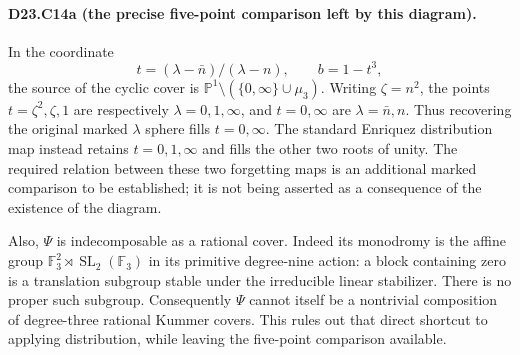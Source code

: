 \paragraph{D23.C14a (the precise five-point comparison left by this diagram).}
In the coordinate
\[
                 t=(\lambda-\bar n)/(\lambda-n),\qquad b=1-t^3,
\]
the source of the cyclic cover is
$\mathbb P^1\setminus(\{0,\infty\}\cup\mu_3)$.
Writing $\zeta=n^2$, the points
$t=\zeta^2,\zeta,1$ are respectively $\lambda=0,1,\infty$,
and $t=0,\infty$ are $\lambda=\bar n,n$.
Thus recovering the original marked $\lambda$ sphere fills
$t=0,\infty$. The standard Enriquez distribution map instead
retains $t=0,1,\infty$ and fills the other two roots of unity.
The required relation between these two forgetting maps is an
additional marked comparison to be established; it is not being
asserted as a consequence of the existence of the diagram.

Also, $\Psi$ is indecomposable as a rational cover. Indeed its
monodromy is the affine group $\mathbb F_3^2\rtimes
\operatorname{SL}_2(\mathbb F_3)$ in its primitive degree-nine
action: a block containing zero is a translation subgroup stable
under the irreducible linear stabilizer. There is no proper such
subgroup. Consequently $\Psi$ cannot itself be a nontrivial
composition of degree-three rational Kummer covers. This rules out
that direct shortcut to applying distribution, while leaving the
five-point comparison available.

